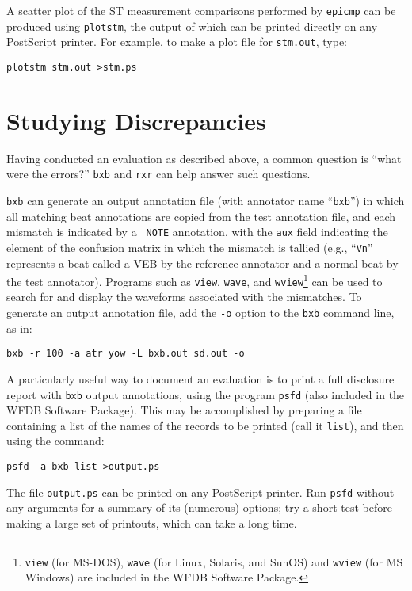 \documentclass[twoside]{article}
\begin{document}
A scatter plot of the ST measurement comparisons performed by {\tt epicmp} can
be produced using {\tt plotstm}, the output of which can be printed directly on
any PostScript printer.  For example, to make a plot file for {\tt stm.out},
type:
\begin{verbatim}
plotstm stm.out >stm.ps
\end{verbatim}

\section{Studying Discrepancies}

Having conducted an evaluation as described above, a common question
is ``what were the errors?''  {\tt bxb} and {\tt rxr} can help
answer such questions.

{\tt bxb} can generate an output annotation file (with annotator name
``{\tt bxb}'') in which all matching beat annotations are copied from
the test annotation file, and each mismatch is indicated by a {\tt
NOTE} annotation, with the {\tt aux} field indicating the element of
the confusion matrix in which the mismatch is tallied (e.g., ``{\tt Vn}''
represents a beat called a VEB by the reference annotator and a normal
beat by the test annotator).  Programs such as {\tt view},
{\tt wave}, and {\tt wview}\footnote{
{\tt view} (for MS-DOS),  {\tt wave} (for Linux, Solaris, and SunOS) and
{\tt wview} (for MS Windows) are included in the WFDB Software Package.}
can be used to search for and display the waveforms associated with the
mismatches.  To generate an output annotation file, add the {\tt -o} option to
the {\tt bxb} command line, as in:
\begin{verbatim}
bxb -r 100 -a atr yow -L bxb.out sd.out -o
\end{verbatim}
A particularly useful way to document an evaluation is to print a
full disclosure report with {\tt bxb} output annotations, using the
program {\tt psfd} (also included in the WFDB Software Package).  This may
be accomplished by preparing a file containing a list of the names of
the records to be printed (call it {\tt list}), and then using the
command:
\begin{verbatim}
psfd -a bxb list >output.ps
\end{verbatim}
The file {\tt output.ps} can be printed on any PostScript printer.
Run {\tt psfd} without any arguments for a summary of its (numerous)
options;  try a short test before making a large set of printouts,
which can take a long time.
\end{document}
